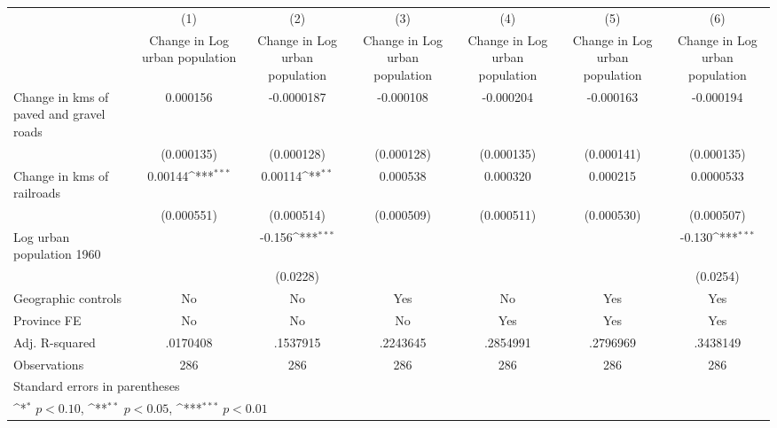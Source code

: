 {
\def\sym#1{\ifmmode^{#1}\else\(^{#1}\)\fi}
\begin{tabular}{l*{6}{c}}
\hline\hline
                    &\multicolumn{1}{c}{(1)}&\multicolumn{1}{c}{(2)}&\multicolumn{1}{c}{(3)}&\multicolumn{1}{c}{(4)}&\multicolumn{1}{c}{(5)}&\multicolumn{1}{c}{(6)}\\
                    &\multicolumn{1}{c}{Change in Log urban population}&\multicolumn{1}{c}{Change in Log urban population}&\multicolumn{1}{c}{Change in Log urban population}&\multicolumn{1}{c}{Change in Log urban population}&\multicolumn{1}{c}{Change in Log urban population}&\multicolumn{1}{c}{Change in Log urban population}\\
\hline
Change in kms of paved and gravel roads&    0.000156         &  -0.0000187         &   -0.000108         &   -0.000204         &   -0.000163         &   -0.000194         \\
                    &  (0.000135)         &  (0.000128)         &  (0.000128)         &  (0.000135)         &  (0.000141)         &  (0.000135)         \\
[1em]
Change in kms of railroads&     0.00144\sym{***}&     0.00114\sym{**} &    0.000538         &    0.000320         &    0.000215         &   0.0000533         \\
                    &  (0.000551)         &  (0.000514)         &  (0.000509)         &  (0.000511)         &  (0.000530)         &  (0.000507)         \\
[1em]
Log urban population 1960&                     &      -0.156\sym{***}&                     &                     &                     &      -0.130\sym{***}\\
                    &                     &    (0.0228)         &                     &                     &                     &    (0.0254)         \\
\hline
Geographic controls &          No         &          No         &         Yes         &          No         &         Yes         &         Yes         \\
Province FE         &          No         &          No         &          No         &         Yes         &         Yes         &         Yes         \\
Adj. R-squared      &    .0170408         &    .1537915         &    .2243645         &    .2854991         &    .2796969         &    .3438149         \\
Observations        &         286         &         286         &         286         &         286         &         286         &         286         \\
\hline\hline
\multicolumn{7}{l}{\footnotesize Standard errors in parentheses}\\
\multicolumn{7}{l}{\footnotesize \sym{*} \(p<0.10\), \sym{**} \(p<0.05\), \sym{***} \(p<0.01\)}\\
\end{tabular}
}
